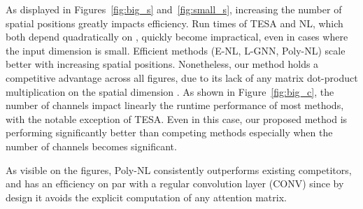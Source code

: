 \documentclass[10pt,twocolumn,letterpaper]{article}
\begin{document}
As displayed in Figures~\ref{fig:big_s} and~\ref{fig:small_s}, increasing the number of spatial positions greatly impacts efficiency. Run times of TESA and NL, which both depend quadratically on , quickly become impractical, even in cases where the input dimension is small. Efficient methods (E-NL, L-GNN, Poly-NL) scale better with increasing spatial positions. Nonetheless, our method holds a competitive advantage across all figures, due to its lack of any matrix dot-product multiplication on the spatial dimension . As shown in Figure~\ref{fig:big_c}, the number of channels impact linearly the runtime performance of most methods, with the notable exception of TESA. Even in this case, our proposed method is performing significantly better than competing methods especially when the number of channels becomes significant. 

As visible on the figures, Poly-NL consistently outperforms existing competitors, and has an efﬁciency on par with a regular convolution layer (CONV) since by design it avoids the explicit computation of any attention matrix.
\end{document}

